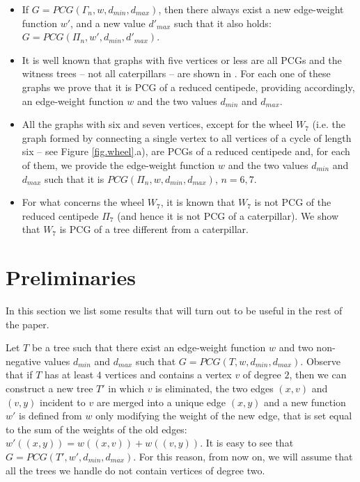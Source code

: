 \documentclass[review]{elsarticle}
\begin{document}
\begin{itemize}
\item
If $G=PCG(\Gamma_n,w,d_{min}, d_{max})$, then there always exist a new edge-weight function $w'$, and a new value $d'_{max}$ such that it also holds: $G=PCG(\Pi_n,w',d_{min}, d'_{max})$. 

\item
It is well known that graphs with five vertices or less are all PCGs and the witness trees -- not all caterpillars -- are shown in \cite{P02}.
For each one of these graphs we prove that it is PCG of a reduced centipede, providing accordingly, an edge-weight function $w$ and the two values $d_{min}$ and $d_{max}$.

\item
All the graphs with six and seven vertices, except for the wheel $W_7$ (i.e. the graph formed by connecting a single vertex to all vertices of a cycle of length six -- see Figure \ref{fig.wheel}.a), are PCGs of a reduced centipede and, for each of them, we provide the edge-weight function $w$ and the two values $d_{min}$ and $d_{max}$ such that it is $PCG(\Pi_n, w, d_{min}, d_{max})$, $n=6, 7$.

\item
For what concerns the wheel $W_7$, it is known \cite{CFS} that $W_7$ is not PCG of the reduced centipede $\Pi_7$ (and hence it is not PCG of a caterpillar). 
We show that $W_7$ is PCG of a tree different from a caterpillar.
\end{itemize}

\section{Preliminaries}


In this section we list some results that will turn out to be useful in the rest of the paper.

Let $T$ be a tree such that there exist an edge-weight function $w$ and two non-negative values $d_{min}$ and $d_{max}$ such that $G=PCG(T,w,d_{min}, d_{max})$.
Observe that if $T$ has at least $4$ vertices and contains a vertex $v$ of degree $2$, then we can construct a new tree $T'$ in which $v$ is eliminated, the two edges $(x,v)$ and $(v,y)$ incident to $v$ are merged into a unique edge $(x,y)$ and a new function $w'$ is defined from $w$ only modifying the weight of the new edge, that is set equal to the sum of the weights of the old edges: $w'((x,y))=w((x,v))+w((v,y))$.
It is easy to see that $G=PCG(T',w',d_{min}, d_{max})$. For this reason, from now on, we will assume that all the trees we handle do not contain vertices of degree two. 
\end{document}
